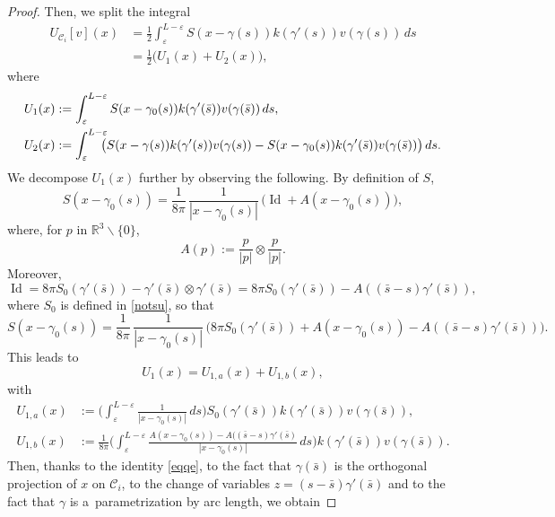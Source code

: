 \documentclass[10pt]{amsart}
\newcommand{\R}{\mathbb{R}}
\let\eps\varepsilon
\newcommand{\dd}{\,d}
\DeclareMathOperator{\Id}{Id}
\theoremstyle{definition}
\theoremstyle{remark}
\begin{document}
\begin{proof}
Then, we split the integral
\begin{align}
\nonumber U_{\mathcal C_i}[v](x) &= \frac12 \int_\eps^{L-\eps} S(x - \gamma(s)) k(\gamma'(s)) v(\gamma (s)) \dd s
\label{indec}
\\ &= \frac12 \big(U_1 (x) + U_2 (x)\big),
\end{align}
where
\begin{align}
U_1 (x) &:= \int_\eps^{L-\eps} S(x - \gamma_0(s)) k(\gamma'(\bar s)) v(\gamma (\bar s)) \dd s, \\
U_2 (x)&:= \int_\eps^{L-\eps} \hspace*{-2mm}\bigl(S(x - \gamma(s)) k(\gamma'(s)) v(\gamma (s)) - S(x - \gamma_0(s)) k(\gamma'(\bar s)) v(\gamma (\bar s))\bigr) \dd s.
\end{align}
We decompose $U_1 (x)$ further by observing the following. By definition of $S$,
\begin{equation}
S(x - \gamma_0(s)) =
{\frac1{8\pi}}\,\frac 1 {|x - \gamma_0(s)|}\, \bigl(
\Id +A(x - \gamma_0(s))\bigr),
\end{equation}
where, for $p$ in $\R^3 \smallsetminus \{0\}$,
\[
A(p) := \frac p {|p|} \otimes \frac p {|p|}.\]
Moreover,
\begin{equation}
\Id = {8\pi} S_0 (\gamma'(\bar s)) - \gamma'(\bar s) \otimes \gamma'(\bar s) = {8\pi}S_0 (\gamma'(\bar s)) - A((\bar s - s) \gamma'(\bar s)),
\end{equation}
where $S_0$ is defined in \eqref{notsu},
so that
\begin{equation}
S(x - \gamma_0(s)) = \frac1{8\pi}\,\frac 1 {|x - \gamma_0(s)|}\, \bigl(
{8\pi}S_0 (\gamma'(\bar s)) +A(x - \gamma_0(s)) - A((\bar s - s) \gamma'(\bar s))\bigr).
\end{equation}
This leads to
\begin{equation}
\label{redec}
U_1 (x) = U_{1,a} (x) + U_{1,b} (x),
\end{equation}
with
\begin{align*}
U_{1,a} (x) &:= \biggl(\int_\eps^{L-\eps} \frac 1 {|x - \gamma_0(s)|} \dd s \biggr) S_0 (\gamma'(\bar s)) k(\gamma'(\bar s)) v(\gamma (\bar s)),\\
U_{1,b} (x) &:=
{\frac1{8\pi}}\biggl(\int_\eps^{L-\eps} \frac {A(x - \gamma_0(s)) - A((\bar s - s) \gamma'(\bar s)} {|x - \gamma_0(s)|}
\dd s \biggr) k(\gamma'(\bar s)) v(\gamma (\bar s)).
\end{align*}
Then, thanks to the identity \eqref{eqqe}, to the fact that $\gamma (\bar s)$ is
the orthogonal projection of $x$ on
$\mathcal C_i$, to the change of variables $z=(s-\bar s)\gamma'(\bar s)$ and to the fact that $\gamma$ is a~parametrization by arc length, we obtain

\end{proof}
\end{document}
